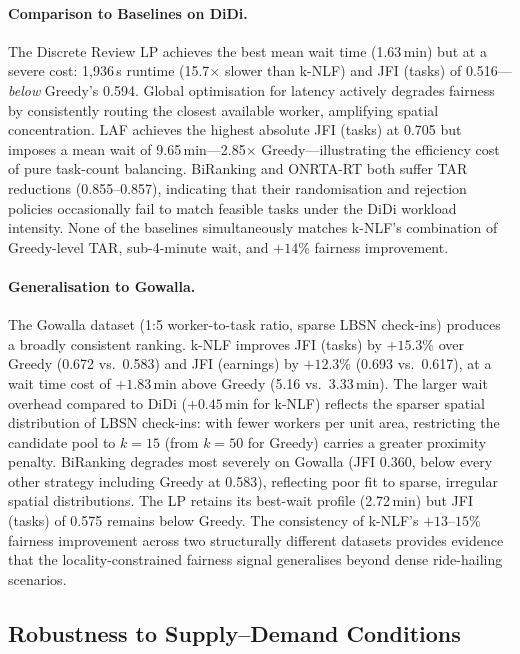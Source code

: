 \paragraph{Comparison to Baselines on DiDi.}
The Discrete Review LP achieves the best mean wait time (1.63\,min) but at a
severe cost: 1{,}936\,s runtime (15.7$\times$ slower than k-NLF) and
JFI (tasks) of 0.516---\textit{below} Greedy's 0.594. Global optimisation for
latency actively degrades fairness by consistently routing the closest available
worker, amplifying spatial concentration. LAF achieves the highest absolute
JFI (tasks) at 0.705 but imposes a mean wait of 9.65\,min---2.85$\times$
Greedy---illustrating the efficiency cost of pure task-count balancing. BiRanking
and ONRTA-RT both suffer TAR reductions (0.855--0.857), indicating that their
randomisation and rejection policies occasionally fail to match feasible tasks
under the DiDi workload intensity. None of the baselines simultaneously matches
k-NLF's combination of Greedy-level TAR, sub-4-minute wait, and $+14\%$ fairness
improvement.

\paragraph{Generalisation to Gowalla.}
The Gowalla dataset (1:5 worker-to-task ratio, sparse LBSN check-ins) produces a
broadly consistent ranking. k-NLF improves JFI (tasks) by $+15.3\%$ over Greedy
(0.672 vs.\ 0.583) and JFI (earnings) by $+12.3\%$ (0.693 vs.\ 0.617), at a
wait time cost of $+1.83$\,min above Greedy (5.16 vs.\ 3.33\,min). The larger
wait overhead compared to DiDi ($+0.45$\,min for k-NLF) reflects the sparser
spatial distribution of LBSN check-ins: with fewer workers per unit area,
restricting the candidate pool to $k{=}15$ (from $k{=}50$ for Greedy) carries a
greater proximity penalty. BiRanking degrades most severely on Gowalla (JFI 0.360,
below every other strategy including Greedy at 0.583), reflecting poor fit to
sparse, irregular spatial distributions. The LP retains its best-wait profile
(2.72\,min) but JFI (tasks) of 0.575 remains below Greedy. The consistency of
k-NLF's $+13$--$15\%$ fairness improvement across two structurally different
datasets provides evidence that the locality-constrained fairness signal
generalises beyond dense ride-hailing scenarios.

\subsection{Robustness to Supply--Demand Conditions}
\label{sec:robustness}

